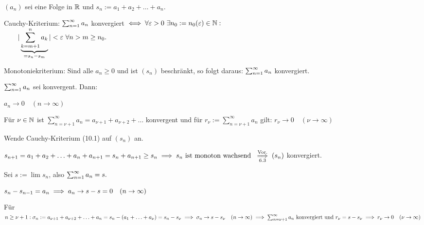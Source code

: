 \documentclass[a4paper,oneside,DIV15,BCOR12mm]{scrbook}
\begin{document}
\begin{satz}
$(a_n)$ sei eine Folge in $\mathbb{R}$ und $s_n := a_1+a_2+\ldots+a_n$.
\begin{liste}
\item Cauchy-Kriterium:
$\sum_{n=1}^{\infty}{a_n}$ konvergiert $\iff \forall \varepsilon>0\ \exists n_0 := n_0(\varepsilon)\in\mathbb{N}:$\\
$\qquad|\underbrace{\sum_{k=m+1}^n{a_k}}_{=s_n-s_m}| < \varepsilon\ \forall n>m \ge n_0.$

\item Monotoniekriterium: Sind alle $a_n \ge 0$ und ist $(s_n)$ beschränkt, so folgt daraus: $\sum_{n=1}^{\infty}{a_n}$ konvergiert.

\item $\sum_{n=1}^{\infty}{a_n}$ sei konvergent. Dann:
 \begin{liste}
 \item $a_n \to 0\quad(n\to\infty)$
 \item Für $\nu\in\mathbb{N}$ ist $\sum_{n=\nu+1}^{\infty}{a_n} = a_{\nu+1}+a_{\nu+2}+\ldots$ konvergent und für $r_\nu := \sum_{n=\nu+1}^{\infty}{a_n}$ gilt: $r_\nu \to 0\quad(\nu \to \infty)$
 \end{liste}
\end{liste}
\end{satz}

\begin{beweise}
\item Wende Cauchy-Kriterium (10.1) auf $(s_n)$ an.

\item $s_{n+1} = a_1+a_2+\ldots+a_n+a_{n+1} = s_n+a_{n+1} \ge s_n \implies s_n\text{ ist monoton wachsend } \overset{\text{Vor.}}{\underset{\text{6.3}}{\implies}} (s_n)$ konvergiert.

\item Sei $s := \lim s_n$, also $\sum_{n=1}^{\infty}{a_n} = s.$
 \begin{liste}
 \item $s_n-s_{n-1} = a_n \implies a_n \to s-s = 0\quad(n\to\infty)$
 \item Für $n \ge \nu+1: \sigma_n := a_{\nu+1}+a_{\nu+2}+\ldots+a_n = s_n-(a_1+\ldots+a_\nu) = s_n-s_\nu\\
 \implies \sigma_n \to s-s_\nu\quad(n\to\infty)\\
 \implies \sum_{n=\nu+1}^{\infty}{a_n}\text{ konvergiert und } r_\nu = s-s_\nu\\
 \implies r_\nu \to 0\quad(\nu\to\infty)$
 \end{liste}
\end{beweise}
\end{document}
